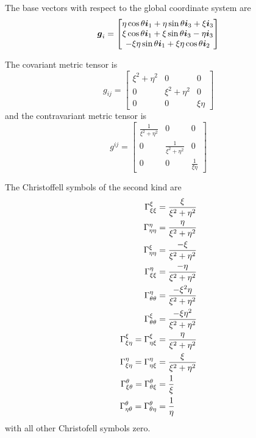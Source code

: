 The base vectors with respect to the global coordinate system are
\begin{equation}
  \vect{g}_{i}=\begin{bmatrix} 
    \eta\cos\theta\vect{i}_{1}+\eta\sin\theta\vect{i}_{3}+\xi\vect{i}_{3}\\
    \xi\cos\theta\vect{i}_{1}+\xi\sin\theta\vect{i}_{3}-\eta\vect{i}_{3}\\ 
    -\xi\eta\sin\theta\vect{i}_{1}+\xi\eta\cos\theta\vect{i}_{2}
  \end{bmatrix}
\end{equation}

The covariant metric tensor is
\begin{equation}
  g_{ij}=\begin{bmatrix}
    \xi^{2}+\eta^{2} & 0 & 0 \\
    0 & \xi^{2}+\eta^{2} & 0 \\
    0 & 0 & \xi\eta
  \end{bmatrix}
\end{equation}
and the contravariant metric tensor is
\begin{equation}
  g^{ij}=\begin{bmatrix}
    \frac{1}{\xi^{2}+\eta^{2}}& 0 & 0 \\
    0 & \frac{1}{\xi^{2}+\eta^{2}} & 0 \\
    0 & 0 & \frac{1}{\xi\eta}
  \end{bmatrix}
\end{equation}

The Christoffell symbols of the second kind are
\begin{align}
   \Gamma^{\xi}_{\xi\xi} &=\frac{\xi}{\xi^{2}+\eta^{2}} \\
   \Gamma^{\eta}_{\eta\eta} &=\frac{\eta}{\xi^{2}+\eta^{2}} \\
   \Gamma^{\xi}_{\eta\eta} &=\frac{-\xi}{\xi^{2}+\eta^{2}} \\
   \Gamma^{\eta}_{\xi\xi} &=\frac{-\eta}{\xi^{2}+\eta^{2}} \\
   \Gamma^{\eta}_{\theta\theta} &=\frac{-\xi^{2}\eta}{\xi^{2}+\eta^{2}} \\
   \Gamma^{\xi}_{\theta\theta} &=\frac{-\xi\eta^{2}}{\xi^{2}+\eta^{2}} \\
   \Gamma^{\xi}_{\xi\eta} = \Gamma^{\xi}_{\eta\xi} &=\frac{\eta}{\xi^{2}+\eta^{2}} \\
   \Gamma^{\eta}_{\xi\eta} = \Gamma^{\eta}_{\eta\xi} &=\frac{\xi}{\xi^{2}+\eta^{2}} \\
   \Gamma^{\theta}_{\xi\theta} = \Gamma^{\theta}_{\theta\xi} &=\frac{1}{\xi} \\
   \Gamma^{\theta}_{\eta\theta} = \Gamma^{\theta}_{\theta\eta} &=\frac{1}{\eta} \\
\end{align}
with all other Christofell symbols zero.

